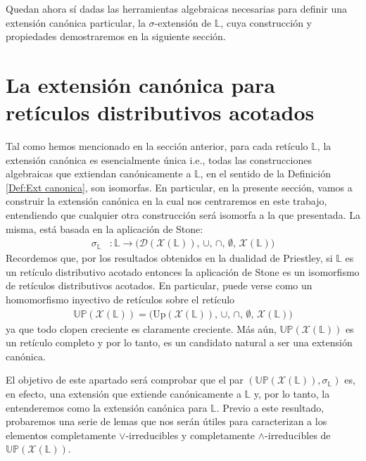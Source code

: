 \documentclass[12pt]{book}
\newcommand{\Up}{\mathbb{UP}}
\begin{document}
Quedan ahora sí dadas las herramientas algebraicas necesarias para definir una extensión canónica particular, la \(\sigma\)-extensión de \(\mathbb{L}\), cuya construcción y propiedades demostraremos en la siguiente sección.





\section{La extensión canónica para retículos distributivos acotados}\label{S4.2}


Tal como hemos mencionado en la sección anterior, para cada retículo $\mathbb{L}$, la extensión canónica es esencialmente única i.e., todas las construcciones algebraicas que extiendan canónicamente a $\mathbb{L}$, en el sentido de la Definición \ref{Def:Ext canonica}, son isomorfas. En particular, en la presente sección, vamos a construir la extensión canónica en la cual nos centraremos en este trabajo, entendiendo que cualquier otra construcción será isomorfa a la que presentada. La misma, está basada en la aplicación de Stone:
\begin{align*}
  \sigma_{\mathbb{L}}&\colon \mathbb{L}\rightarrow\bigl(\mathcal{D}(\mathcal{X}(\mathbb{L})),\,\cup,\,\cap,\,\emptyset,\,\mathcal{X}(\mathbb{L})\bigr)
\end{align*}
Recordemos que, por los resultados obtenidos en la dualidad de Priestley, si $\mathbb{L}$ es un retículo distributivo acotado entonces la aplicación de Stone es un isomorfismo de retículos distributivos acotados. En particular, puede verse como un homomorfismo inyectivo de retículos sobre el retículo
\begin{align*}
  \Up(\mathcal{X}(\mathbb{L}))=\bigl(\mathrm{Up}(\mathcal{X}(\mathbb{L})),\,\cup,\,\cap,\,\emptyset,\,\mathcal{X}(\mathbb{L})\bigr)
\end{align*}
ya que todo clopen creciente es claramente creciente. Más aún, $\Up(\mathcal{X}(\mathbb{L}))$ es un retículo completo y por lo tanto, es un candidato natural a ser una extensión canónica.

El objetivo de este apartado será comprobar que el par $\left(\Up(\mathcal{X}(\mathbb{L})),\sigma_{\mathbb{L}} \right)$ es, en efecto, una extensión que extiende canónicamente a $\mathbb{L}$ y, por lo tanto, la entenderemos como la extensión canónica para $\mathbb{L}$. Previo a este resultado, probaremos una serie de lemas que nos serán útiles para caracterizan a los elementos completamente $\vee$-irreducibles y completamente $\wedge$-irreducibles de $\Up(\mathcal{X}(\mathbb{L}))$.
 
\end{document}
